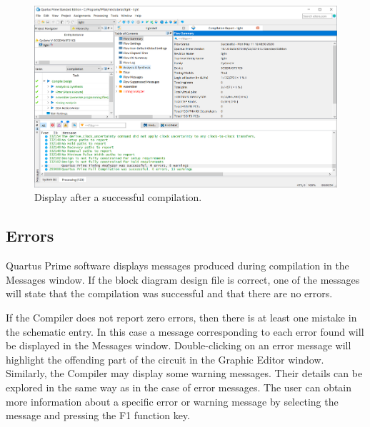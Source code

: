 \documentclass[11pt, twoside, pdftex]{article}
\begin{document}
\begin{figure}[H]
   \begin{center}
      \includegraphics[scale=0.4]{figures/figure20.png}
   \caption{Display after a successful compilation.} 
	 \label{fig:20}
	 \end{center}
\end{figure}

\subsection{Errors}

Quartus Prime software displays messages produced during compilation in the Messages window.
If the block diagram design file is correct, one of the messages will
state that the compilation was successful and that there are no
errors.

If the Compiler does not report zero errors, then there is at least one mistake 
in the schematic entry. In this case a
message corresponding to each error found will
be displayed in the Messages window.
Double-clicking on an error message will highlight the offending
part of the circuit in the Graphic Editor window. 
Similarly, the Compiler may display some warning messages. Their details can be
explored in the same way as in the case of error messages.
The user can obtain more information about a specific error or warning message
by selecting the message and pressing the {\sf F1} function key.
\end{document}
